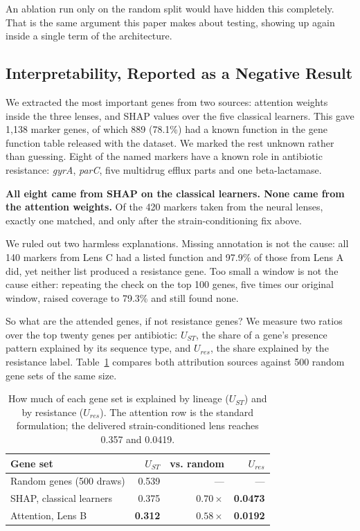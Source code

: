 \documentclass[conference]{IEEEtran}
\begin{document}
An ablation run only on the random split would have hidden this completely. That is
the same argument this paper makes about testing, showing up again inside a single
term of the architecture.

\subsection{Interpretability, Reported as a Negative Result}

We extracted the most important genes from two sources: attention weights inside the
three lenses, and SHAP values \cite{lundberg2017} over the five classical learners.
This gave 1{,}138 marker genes, of which 889 (78.1\%) had a known function in the
gene function table released with the dataset. We marked the rest unknown rather
than guessing. Eight of the named markers have a known role in antibiotic
resistance: \textit{gyrA}, \textit{parC}, five multidrug efflux parts and one
beta-lactamase.

\textbf{All eight came from SHAP on the classical learners. None came from the
attention weights.} Of the 420 markers taken from the neural lenses, exactly one
matched, and only after the strain-conditioning fix above.

We ruled out two harmless explanations. Missing annotation is not the cause: all 140
markers from Lens C had a listed function and 97.9\% of those from Lens A did, yet
neither list produced a resistance gene. Too small a window is not the cause either:
repeating the check on the top 100 genes, five times our original window, raised
coverage to 79.3\% and still found none.

So what are the attended genes, if not resistance genes? We measure two ratios over
the top twenty genes per antibiotic: $U_{ST}$, the share of a gene's presence
pattern explained by its sequence type, and $U_{res}$, the share explained by the
resistance label. Table~\ref{tab:umark} compares both attribution sources against
500 random gene sets of the same size.

\begin{table}[t]
\caption{How much of each gene set is explained by lineage ($U_{ST}$) and by
resistance ($U_{res}$). The attention row is the standard formulation; the delivered
strain-conditioned lens reaches 0.357 and 0.0419.}
\label{tab:umark}
\centering
\small
\setlength{\tabcolsep}{4pt}
\renewcommand{\arraystretch}{1.15}
\begin{tabular}{|l|r|r|r|}
\hline
\rowcolor{headgrey}
\textbf{Gene set} & \textbf{$U_{ST}$} & \textbf{vs. random} & \textbf{$U_{res}$} \\ \hline
Random genes (500 draws) & 0.539 & --- & --- \\ \hline
SHAP, classical learners & 0.375 & $0.70\times$ & \textbf{0.0473} \\ \hline
Attention, Lens B & \textbf{0.312} & $0.58\times$ & \textbf{0.0192} \\ \hline
\end{tabular}
\renewcommand{\arraystretch}{1.0}
\end{table}
\end{document}
